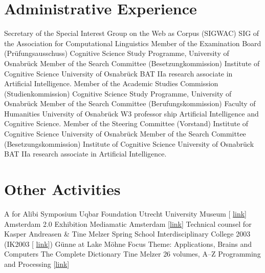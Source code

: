 \documentclass[11pt,a4paper]{moderncv}
\begin{document}
\section{Administrative Experience}
        {Secretary of the Special Interest Group on the Web as Corpus (SIGWAC)}
        {}
        {SIG of the Association for Computational Linguistics}
        {}
        {}
        {Member of the Examination Board (Pr\"{u}fungsausschuss)}
        {}
        {Cognitive Science Study Programme, University of Osnabr\"{u}ck}
        {}
        {}
        {Member of the Search Committee (Besetzungkommission)}
        {}
        {Institute of Cognitive Science}
        {University of Osnabr\"{u}ck}
        {BAT IIa research associate in Artificial Intelligence.}
        {Member of the Academic Studies Commission (Studienkommission)}
        {}
        {Cognitive Science Study Programme, University of Osnabr\"{u}ck}
        {}
        {}
        {Member of the Search Committee (Berufungskommission)}
        {}
        {Faculty of Humanities}
        {University of Osnabr\"{u}ck}
        {W3 professor ship Artificial Intelligence and Cognitive Science.}
        {Member of the Steering Committee (Vorstand)}
        {}
        {Institute of Cognitive Science}
        {University of Osnabr\"{u}ck}
        {}
        {Member of the Search Committee (Besetzungskommission)}
        {}
        {Institute of Cognitive Science}
        {University of Osnabr\"{u}ck}
        {BAT IIa research associate in Artificial Intelligence.}
\closesection{}


\section{Other Activities}
        {A for Alibi Symposium}
        {}
        {Uqbar Foundation}
        {Utrecht University Museum [%
        \href{http://www.sternbergpress.com/?pageId=1204}{link}]}
        {}	
        {Amsterdam 2.0 Exhibition}
        {}
        {Mediamatic}
        {Amsterdam [\href{http://www.mediamatic.net/artefact-9850-en.html}%
        {link}]}
        {Technical counsel for Kasper Andreasen \& Tine Melzer}
        {Spring School}
        {}
        {Interdisciplinary College 2003 (IK2003 [%
        \href{http://www.ik-guenne.de/html/ik2003.html}{link}])}
        {G\"{u}nne at Lake M\"{o}hne}
        {Focus Theme: Applications, Brains and Computers}
        {The Complete Dictionary}
        {}
        {Tine Melzer}
        {26 volumes, A--Z}
        {Programming and Processing
        [\href{http://www.tinemelzer.eu/works/the-complete-dictionary/}
        {link}]}
\end{document}
